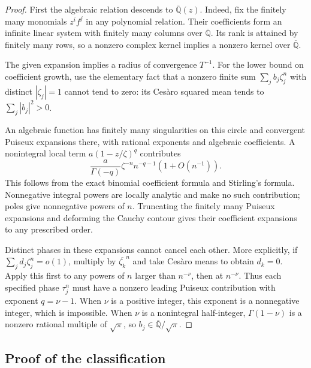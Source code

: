 \documentclass[11pt,a4paper]{article}
\theoremstyle{definition}
\theoremstyle{remark}
\numberwithin{equation}{section}
\begin{document}
\begin{proof}
First the algebraic relation descends to $\overline{\mathbb Q}(z)$.
Indeed, fix the finitely many monomials $z^if^j$ in any polynomial
relation. Their coefficients form an infinite linear system with
finitely many columns over $\overline{\mathbb Q}$. Its rank is
attained by finitely many rows, so a nonzero complex kernel implies
a nonzero kernel over $\overline{\mathbb Q}$.

The given expansion implies a radius of convergence $T^{-1}$.
For the lower bound on coefficient growth, use the elementary fact
that a nonzero finite sum $\sum_jb_j\zeta_j^n$ with distinct
$|\zeta_j|=1$ cannot tend to zero: its Ces\`aro squared mean tends
to $\sum_j|b_j|^2>0$.

An algebraic function has finitely many singularities on this circle
and convergent Puiseux expansions there, with rational exponents and
algebraic coefficients. A nonintegral local term
$a(1-z/\zeta)^q$ contributes
\[
 \frac{a}{\Gamma(-q)}\zeta^{-n}n^{-q-1}(1+O(n^{-1})).
\]
This follows from the exact binomial coefficient formula and Stirling's
formula. Nonnegative integral powers are locally analytic and make
no such contribution; poles give nonnegative powers of $n$.
Truncating the finitely many Puiseux expansions and deforming the
Cauchy contour gives their coefficient expansions to any prescribed
order.

Distinct phases in these expansions cannot cancel each other.
More explicitly, if $\sum_jd_j\zeta_j^n=o(1)$, multiply by
$\overline{\zeta_k}^n$ and take Ces\`aro means to obtain $d_k=0$.
Apply this first to any powers of $n$ larger than $n^{-\nu}$, then
at $n^{-\nu}$. Thus each specified phase $\tau_j^n$ must have a
nonzero leading Puiseux contribution with exponent $q=\nu-1$.
When $\nu$ is a positive integer, this exponent is a nonnegative
integer, which is impossible. When $\nu$ is a nonintegral
half-integer, $\Gamma(1-\nu)$ is a nonzero rational multiple of
$\sqrt\pi$, so $b_j\in\overline{\mathbb Q}/\sqrt\pi$.
\end{proof}

\subsection{Proof of the classification}
\end{document}
